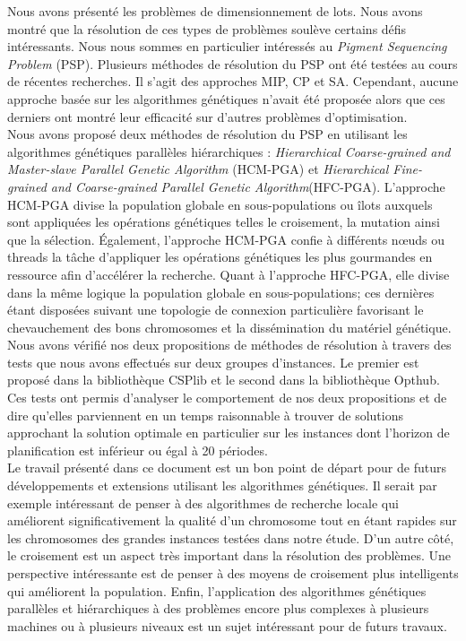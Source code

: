 
Nous avons présenté	les problèmes de dimensionnement de lots. Nous avons montré que la résolution de ces types de problèmes soulève certains défis intéressants. Nous nous sommes en particulier intéressés au \emph{Pigment Sequencing Problem} (PSP). Plusieurs méthodes de résolution du PSP ont été testées au cours de récentes recherches. Il s'agit des approches MIP, CP et SA. Cependant, aucune approche basée sur les algorithmes génétiques n'avait été proposée alors que ces derniers ont montré leur efficacité sur d'autres problèmes d'optimisation.\\
	\hspace*{.5cm} Nous avons proposé deux méthodes de résolution du PSP en utilisant les algorithmes génétiques parallèles hiérarchiques : \emph{Hierarchical Coarse-grained and Master-slave Parallel Genetic Algorithm} (HCM-PGA) et \emph{Hierarchical Fine-grained and Coarse-grained Parallel Genetic Algorithm}(HFC-PGA). L'approche HCM-PGA divise la population globale en sous-populations ou îlots auxquels sont appliquées les opérations génétiques telles le croisement, la mutation ainsi que la sélection. Également, l'approche HCM-PGA confie à différents nœuds ou threads la tâche d'appliquer les opérations génétiques les plus gourmandes en ressource afin d'accélérer la recherche. Quant à l'approche HFC-PGA, elle divise dans la même logique la population globale en sous-populations; ces dernières étant disposées suivant une topologie de connexion particulière favorisant le chevauchement des bons chromosomes et la dissémination du matériel génétique. Nous avons vérifié nos deux propositions de méthodes de résolution à travers des tests que nous avons effectués sur deux groupes d'instances. Le premier est proposé dans la bibliothèque CSPlib et le second dans la bibliothèque Opthub. Ces tests ont permis d'analyser le comportement de nos deux propositions et de dire qu'elles parviennent en un temps raisonnable à trouver de solutions approchant la solution optimale en particulier sur les instances dont l'horizon de planification est inférieur ou égal à 20 périodes.\\
	\hspace*{.5cm}Le travail présenté dans ce document est un bon point de départ pour de futurs développements et extensions utilisant les algorithmes génétiques. Il serait par exemple intéressant de penser à des algorithmes de recherche locale qui améliorent significativement la qualité d'un chromosome tout en étant rapides sur les chromosomes des grandes instances testées dans notre étude. D'un autre côté, le croisement est un aspect très important dans la résolution des problèmes. Une perspective intéressante est de penser à des moyens de croisement plus intelligents qui améliorent la population. Enfin, l'application des algorithmes génétiques parallèles et hiérarchiques à des problèmes encore plus complexes à plusieurs machines ou à plusieurs niveaux est un sujet intéressant pour de futurs travaux. 